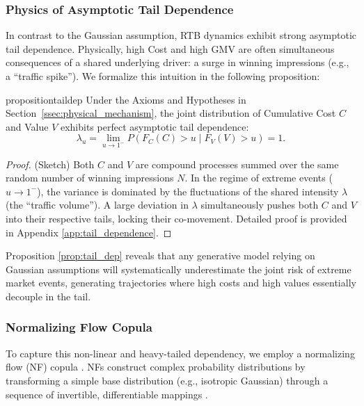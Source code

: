 \documentclass[sigconf, anonymous, review]{acmart}
\begin{document}
\subsubsection{Physics of Asymptotic Tail Dependence}
In contrast to the Gaussian assumption, RTB dynamics exhibit strong asymptotic tail dependence. Physically, high Cost and high GMV are often simultaneous consequences of a shared underlying driver: a surge in winning impressions (e.g., a ``traffic spike'').
We formalize this intuition in the following proposition:

\begin{restatable}{proposition}{taildep}
\label{prop:tail_dep}
Under the Axioms and Hypotheses in Section~\ref{ssec:physical_mechanism}, the joint distribution of Cumulative Cost $C$ and Value $V$ exhibits perfect asymptotic tail dependence:
\begin{equation}
    \lambda_u = \lim_{u \to 1^-} P(F_C(C) > u \mid F_V(V) > u) = 1.
\end{equation}
\end{restatable}
\begin{proof}
(Sketch) Both $C$ and $V$ are compound processes summed over the same random number of winning impressions $N$. In the regime of extreme events ($u \to 1^-$), the variance is dominated by the fluctuations of the shared intensity $\lambda$ (the ``traffic volume''). A large deviation in $\lambda$ simultaneously pushes both $C$ and $V$ into their respective tails, locking their co-movement. Detailed proof is provided in Appendix \ref{app:tail_dependence}.
\end{proof}

Proposition \ref{prop:tail_dep} reveals that any generative model relying on Gaussian assumptions will systematically underestimate the joint risk of extreme market events, generating trajectories where high costs and high values essentially decouple in the tail.

\subsubsection{Normalizing Flow Copula}
To capture this non-linear and heavy-tailed dependency, we employ a normalizing flow (NF) copula \cite{wiese2019copula}.
NFs construct complex probability distributions by transforming a simple base distribution (e.g., isotropic Gaussian) through a sequence of invertible, differentiable mappings \cite{kingma2016improved,huang2018neural}.
\end{document}
